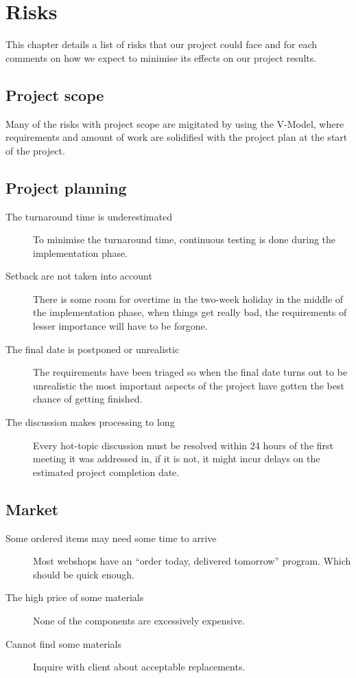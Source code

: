 \chapter{Risks}

This chapter details a list of risks that our project could face and for each comments on how we expect to minimise its effects on our project results.

\section{Project scope}
Many of the risks with project scope are migitated by using the V-Model, where requirements and amount of work are solidified with the project plan at the start of the project.

\section{Project planning}
\begin{description}
\item[The turnaround time is underestimated] To minimise the turnaround time, continuous testing is done during the implementation phase. \\
\item[Setback are not taken into account] There is some room for overtime in the two-week holiday in the middle of the implementation phase, when things get really bad, the requirements of lesser importance will have to be forgone. \\
\item[The final date is postponed or unrealistic] The requirements have been triaged so when the final date turns out to be unrealistic the most important aspects of the project have gotten the best chance of getting finished. \\
\item[The discussion makes processing to long] Every hot-topic discussion must be resolved within 24 hours of the first meeting it was addressed in, if it is not, it might incur delays on the estimated project completion date. \\
\end{description}

\section{Market}
\begin{description}
\item[Some ordered items may need some time to arrive] Most webshops have an ``order today, delivered tomorrow'' program. Which should be quick enough.\\
\item[The high price of some materials] None of the components are excessively expensive. \\
\item[Cannot find some materials] Inquire with client about acceptable replacements. \\
\end{description}

